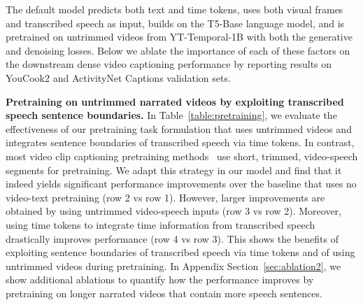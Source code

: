 The default \model{} model predicts both text and time tokens, uses both visual frames and transcribed speech as input, builds on the T5-Base language model, and is pretrained on untrimmed videos from YT-Temporal-1B with both the generative and denoising losses.
Below we ablate the importance of each of these factors on the downstream dense video captioning performance by reporting results on YouCook2 and ActivityNet Captions validation sets. 

\noindent \textbf{Pretraining on untrimmed narrated videos by exploiting transcribed speech sentence boundaries.} 
In Table~\ref{table:pretraining}, we evaluate the effectiveness of our pretraining task formulation that uses untrimmed videos and integrates sentence boundaries of transcribed speech via time tokens.
In contrast, most video clip captioning pretraining methods~\cite{huang2020multimodal, luo2020univilm, seo2022end} use short, trimmed, video-speech segments for pretraining.
We adapt this strategy in our model and find that it indeed yields significant performance improvements over the baseline that uses no video-text pretraining (row 2 vs row 1).
However, larger improvements are obtained by using untrimmed video-speech inputs (row 3 vs row 2).
Moreover, using time tokens to integrate time information from transcribed speech drastically improves performance (row 4 vs row 3).
This shows the benefits of exploiting sentence boundaries of transcribed speech via time tokens and of using untrimmed videos during pretraining.
In Appendix Section~\ref{sec:ablation2}, we show additional ablations to quantify how the performance improves by pretraining on longer narrated videos that contain more speech sentences.

